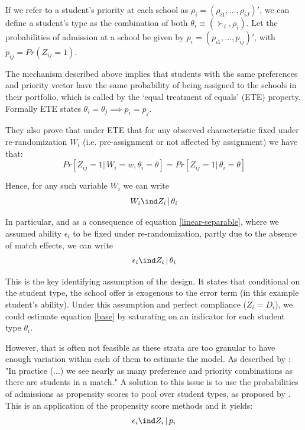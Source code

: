 \documentclass[a4paper, article, english, oneside, unknownkeysallowed, 12pt]{memoir}
\begin{document}
If we refer to a student's priority at each school as $\rho_i = (\rho_{i1}, ...,\rho_{iJ})'$, we can define a student's type as the combination of both $\theta_i \equiv (\succ_i, \rho_i)$.
Let the probabilities of admission at a school be given by $p_i = (p_{i1}, ..., p_{ij})'$, with $p_{ij} = Pr(Z_{ij} = 1)$.

The mechanism described above implies that students with the same preferences and priority vector have the same probability of being assigned to the schools in their portfolio, which is called by \textcite{abdulkadiroglu_research_2017} the `equal treatment of equals' (ETE) property. 
Formally ETE states $\theta_i = \theta_j \implies p_i = p_j$. 

They also prove that under ETE that for any observed characteristic fixed under re-randomization $W_i$ (i.e. pre-assignment or not affected by assignment) we have that:
\begin{equation}
 Pr[Z_{ij} = 1|\, W_i = w, \theta_i = \theta] = Pr[Z_{ij} = 1 | \, \theta_i = \theta]  
\end{equation}

Hence, for any such variable $W_i$ we can write 
\begin{equation}
 W_i \ind Z_i \, | \, \theta_i 
 \label{w ind}  
\end{equation}

In particular, and as a consequence of equation \ref{linear-separable}, where we assumed ability $\epsilon_i$ to be fixed under re-randomization, partly due to the absence of match effects, we can write
\begin{equation}
  \epsilon_i \ind Z_i \, | \, \theta_i   
\end{equation}

This is the key identifying assumption of the design.
It states that conditional on the student type, the school offer is exogenous to the error term (in this example student's ability).
Under this assumption and perfect compliance ($Z_i = D_i$), we could estimate equation \ref{base} by saturating on an indicator for each student type $\theta_i$. 

However, that is often not feasible as these strata are too granular to have enough variation within each of them to estimate the model. 
As described by \textcite{angrist_credible_2024}: "In practice (...) we see nearly as many preference and priority combinations as there are students in a match."  
A solution to this issue is to use the probabilities of admissions as propensity scores to pool over student types, as proposed by \textcite{abdulkadiroglu_research_2017}. 
This is an application of the propensity score methods \parencite{rosenbaum_central_1983} and it yields:  
\begin{equation}
  \epsilon_i \ind Z_i \, | \, p_i 
  \label{CRA}
\end{equation}
\end{document}
